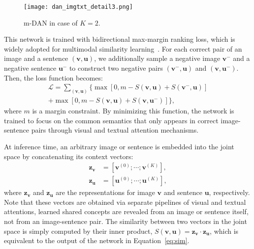 \documentclass[10pt,twocolumn,letterpaper]{article}
\begin{document}
\begin{figure}[t]
\begin{center}
\texttt{[image: dan\_imgtxt\_detail3.png]}
\caption{
m-DAN in case of $K=2$.
}
\label{fig:dan_matching_detail}
\vspace{-5mm}
\end{center}
\end{figure}

This network is trained with bidirectional max-margin ranking loss, which is widely adopted for multimodal similarity learning~\cite{karpathy2014deep,karpathy2015deep,kiros2015unifying,wang2016learning}.
For each correct pair of an image and a sentence $(\mathbf{v},\mathbf{u})$, we additionally sample a negative image $\mathbf{v}^-$ and a negative sentence $\mathbf{u}^-$ to construct two negative pairs $(\mathbf{v}^-,\mathbf{u})$ and $(\mathbf{v},\mathbf{u}^-)$.
Then, the loss function becomes:
\begin{align}
\mathcal{L} = \sum_{(\mathbf{v},\mathbf{u})} \Big\{ 
		     \max \left[ 0, m - S(\mathbf{v},\mathbf{u}) + S(\mathbf{v}^-,\mathbf{u}) \right] \nonumber \\
		    + \max \left[ 0, m - S(\mathbf{v},\mathbf{u}) + S(\mathbf{v},\mathbf{u}^-) \right] \Big\},
\label{eq:loss_matching}
\end{align}
where $m$ is a margin constraint.
By minimizing this function, the network is trained to focus on the common semantics that only appears in correct image-sentence pairs through visual and textual attention mechanisms.

At inference time, an arbitrary image or sentence is embedded into the joint space by concatenating its context vectors:
\begin{align}
	\mathbf{z}_\mathbf{v} &= [\mathbf{v}^{(0)};\cdots;\mathbf{v}^{(K)}], \\
	\mathbf{z}_\mathbf{u} &= [\mathbf{u}^{(0)};\cdots;\mathbf{u}^{(K)}],
\end{align}
where $\mathbf{z}_\mathbf{v}$ and $\mathbf{z}_\mathbf{u}$ are the representations for image $\mathbf{v}$ and sentence $\mathbf{u}$, respectively.
Note that these vectors are obtained via separate pipelines of visual and textual attentions, \ie learned shared concepts are revealed from an image or sentence itself, not from an image-sentence pair.
The similarity between two vectors in the joint space is simply computed by their inner product, \eg $S(\mathbf{v}, \mathbf{u}) = \mathbf{z}_\mathbf{v} \cdot \mathbf{z}_\mathbf{u}$, which is equivalent to the output of the network in Equation~\ref{eq:sim}.
\end{document}
